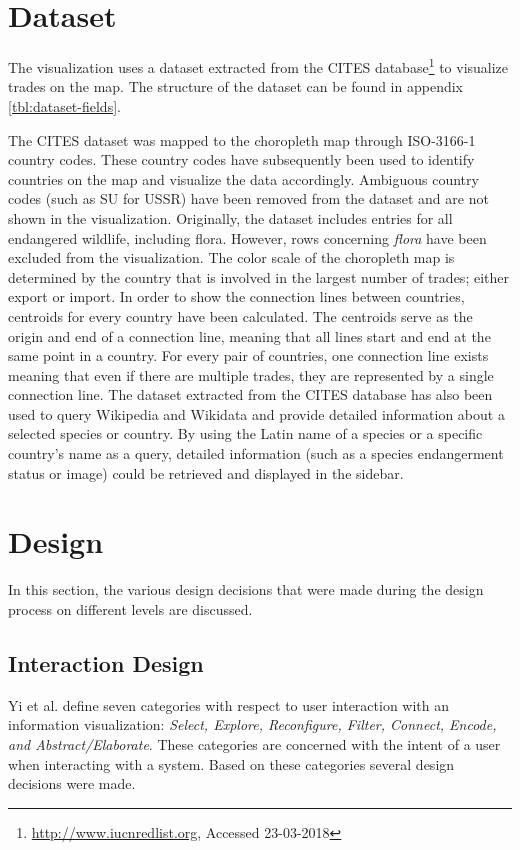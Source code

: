 \section{Dataset} \label{data}
The visualization uses a dataset extracted from the CITES database\footnote{\url{http://www.iucnredlist.org}, Accessed 23-03-2018} to visualize trades on the map. The structure of the dataset can be found in appendix \ref{tbl:dataset-fields}. 

The CITES dataset was mapped to the choropleth map through \mbox{ISO-3166-1} country codes. These country codes have subsequently been used to identify countries on the map and visualize the data accordingly. Ambiguous country codes (such as SU for USSR) have been removed from the dataset and are not shown in the visualization. 
Originally, the dataset includes entries for all endangered wildlife, including flora. However, rows concerning \textit{flora} have been excluded from the visualization. The color scale of the choropleth map is determined by the country that is involved in the largest number of trades; either export or import. In order to show the connection lines between countries, centroids for every country have been calculated. The centroids serve as the origin and end of a connection line, meaning that all lines start and end at the same point in a country. For every pair of countries, one connection line exists meaning that even if there are multiple trades, they are represented by a single connection line. 
The dataset extracted from the CITES database has also been used to query Wikipedia and Wikidata and provide detailed information about a selected species or country. By using the Latin name of a species or a specific country's name as a query, detailed information (such as a species endangerment status or image) could be retrieved and displayed in the sidebar. 

\section{Design} \label{design}
In this section, the various design decisions that were made during the design process on different levels are discussed. 

\subsection{Interaction Design} \label{InteractionDesign}
Yi et al. \cite{Yi2007} define seven categories with respect to user interaction with an information visualization: \textit{Select, Explore, Reconfigure, Filter, Connect, Encode, and Abstract/Elaborate}. These categories are concerned with the intent of a user when interacting with a system. Based on these categories several design decisions were made.

